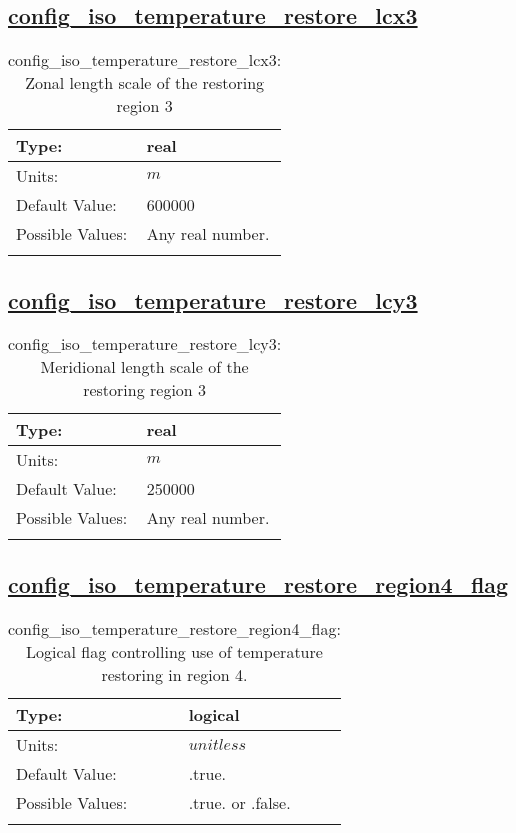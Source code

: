 \subsection[config\_iso\_temperature\_restore\_lcx3]{\hyperref[sec:nm_tab_iso]{config\_iso\_temperature\_restore\_lcx3}}
\label{subsec:nm_sec_config_iso_temperature_restore_lcx3}
\begin{center}
\begin{longtable}{| p{2.0in} || p{4.0in} |}
    \hline
    Type: & real \\
    \hline
    Units: & $m$ \\
    \hline
    Default Value: & 600000 \\
    \hline
    Possible Values: & Any real number. \\
    \hline
    \caption{config\_iso\_temperature\_restore\_lcx3: Zonal length scale of the restoring region 3}
\end{longtable}
\end{center}
\subsection[config\_iso\_temperature\_restore\_lcy3]{\hyperref[sec:nm_tab_iso]{config\_iso\_temperature\_restore\_lcy3}}
\label{subsec:nm_sec_config_iso_temperature_restore_lcy3}
\begin{center}
\begin{longtable}{| p{2.0in} || p{4.0in} |}
    \hline
    Type: & real \\
    \hline
    Units: & $m$ \\
    \hline
    Default Value: & 250000 \\
    \hline
    Possible Values: & Any real number. \\
    \hline
    \caption{config\_iso\_temperature\_restore\_lcy3: Meridional length scale of the restoring region 3}
\end{longtable}
\end{center}
\subsection[config\_iso\_temperature\_restore\_region4\_flag]{\hyperref[sec:nm_tab_iso]{config\_iso\_temperature\_restore\_region4\_flag}}
\label{subsec:nm_sec_config_iso_temperature_restore_region4_flag}
\begin{center}
\begin{longtable}{| p{2.0in} || p{4.0in} |}
    \hline
    Type: & logical \\
    \hline
    Units: & $unitless$ \\
    \hline
    Default Value: & .true. \\
    \hline
    Possible Values: & .true. or .false. \\
    \hline
    \caption{config\_iso\_temperature\_restore\_region4\_flag: Logical flag controlling use of temperature restoring in region 4.}
\end{longtable}
\end{center}
